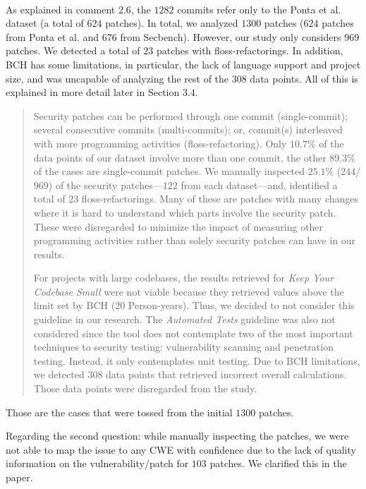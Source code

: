 \documentclass[11pt,fleqn]{article}
\newcommand{\eline}{\vspace*{.75\baselineskip}}
\newcommand{\Us}{\eline \noindent {\bf Response:}\\}
\begin{document}
\Us As explained in comment $2.6$, the $1282$ commits refer only to the Ponta et al. dataset (a total of $624$ 
patches). In total, we analyzed $1300$ patches ($624$ patches from Ponta et al. and $676$ from Secbench). 
However, our study only considers $969$ patches. We detected a total of $23$ patches with floss-refactorings. 
In addition, BCH has some limitations, in particular, the lack of language support and project size,
and was uncapable of analyzing the rest of the $308$ data points. All of this is explained
in more detail later in Section 3.4. 

\begin{quote}
    Security patches can be performed through one commit (single-commit); 
    several consecutive commits (multi-commits); or, commit(s) interleaved with more 
    programming activities (floss-refactoring). Only $10.7\%$ of the data points 
    of our dataset involve more than one commit, the other
    $89.3\%$ of the cases are single-commit patches. We manually 
    inspected $25.1\%$ ($244$/$969$) of the security patches---$122$ from each dataset---and, 
    identified a total of $23$ floss-refactorings. Many of these 
    are patches with many changes where it is hard to understand which parts 
    involve the security patch. These were disregarded to minimize the impact 
    of measuring other programming activities rather than solely security patches
    can have in our results. 
    
    For projects with large codebases, the results retrieved for 
    \emph{Keep Your Codebase Small} were not viable because they 
    retrieved values above the limit set by BCH ($20$ Person-years). Thus, 
    we decided to not consider this guideline in our research. The 
    \emph{Automated Tests} guideline was also not considered since the 
    tool does not contemplate two of the most important techniques to 
    security testing: vulnerability scanning and penetration testing. 
    Instead, it only contemplates unit testing. Due to BCH limitations, 
    we detected $308$ data points that retrieved incorrect overall 
    calculations. Those data points were disregarded from the study.
\end{quote}

Those are the cases that were tossed from the initial $1300$ patches. 

Regarding the second question:
while manually inspecting the patches, we were not able to map
the issue to any CWE with confidence due to the lack of quality
information on the vulnerability/patch for $103$ patches. 
We clarified this in the paper.
\end{document}
